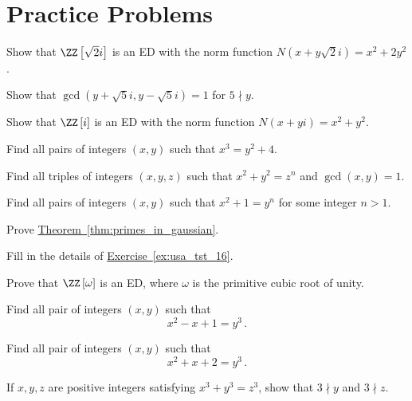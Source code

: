 \documentclass[11pt]{scrartcl}
\begin{document}
\section{Practice Problems}
\begin{problem}
Show that \(\ZZ \left[\sqrt 2 i\right] \) is an ED with the norm function \( N \left(x+ y \sqrt 2i\right) = x^2 + 2y^2\).
\end{problem}
\begin{problem}
Show that \(\gcd \left( y + \sqrt 5i , y - \sqrt 5i \right) =1\) for \(5 \nmid y\).
\end{problem}
\begin{problem}
Show that \(\ZZ \left[ i\right] \) is an ED with the norm function \( N \left(x+ y i\right) = x^2 + y^2\).
\end{problem}
\begin{problem}
Find all pairs of integers \(\left(x,y\right) \) such that \(x^3 = y^2 +4\).%
\end{problem}
\begin{problem}
Find all triples of integers \(\left(x,y,z\right) \) such that \(x^2 + y^2 = z^n\) and \(\gcd \left(x,y\right) =1\).
\end{problem}
\begin{problem}
Find all pairs of integers \(\left(x,y\right) \) such that \(x^2 + 1 = y^n\) for some integer \(n > 1\).
\end{problem}
\begin{problem}
Prove \hyperref[thm:primes_in_gaussian]{Theorem~\ref*{thm:primes_in_gaussian}}.
\end{problem}
\begin{problem}
Fill in the details of \hyperref[ex:usa_tst_16]{Exercise~\ref*{ex:usa_tst_16}}.
\end{problem}
\begin{problem}
Prove that \(\ZZ \left[\omega\right] \) is an ED, where \(\omega\) is the primitive cubic root of unity.
\end{problem}
\begin{problem}
Find all pair of integers \(\left(x,y\right) \) such that
\[ x^2-x+1 = y^3 \,. \]
\end{problem}
\begin{problem}
Find all pair of integers \(\left(x,y\right) \) such that
\[ x^2+x+2 = y^3 \,. \]
\end{problem}
\begin{problem}
If \(x,y,z\) are positive integers satisfying \(x^3 + y^3 = z^3\), show that \(3 \nmid y\) and \(3 \nmid z\).
\end{problem}
\end{document}
